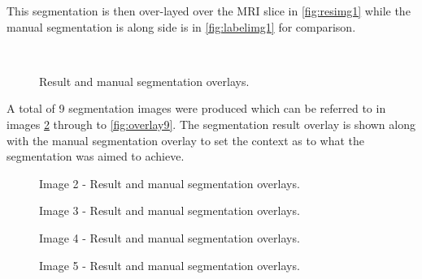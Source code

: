 This segmentation is then over-layed over the MRI slice in \ref{fig:resimg1} while the manual segmentation is along side is in \ref{fig:labelimg1} for comparison. 

\begin{figure}[H]
    \centering
    \\
    \caption{Result and manual segmentation overlays.}%
    \label{fig:overlay1}
\end{figure}

A total of 9 segmentation images  were produced which can be referred to in images \ref{fig:overlay2} through to \ref{fig:overlay9}. The segmentation result overlay is shown along with the manual segmentation overlay to set the context as to what the segmentation was aimed to achieve.

\begin{figure}[H]
    \centering
    \quad
    \caption{Image 2 - Result and manual segmentation overlays.}%
    \label{fig:overlay2}
\end{figure}

\begin{figure}[H]
    \centering
    \quad
    \caption{Image 3 - Result and manual segmentation overlays.}%
    \label{fig:overlay3}
\end{figure}
 
 \begin{figure}[H]
    \centering
    \quad
    \caption{Image 4 - Result and manual segmentation overlays.}%
    \label{fig:overlay4}
\end{figure}

\begin{figure}[H]
    \centering
    \quad
    \caption{Image 5 - Result and manual segmentation overlays.}%
    \label{fig:overlay5}
\end{figure}

